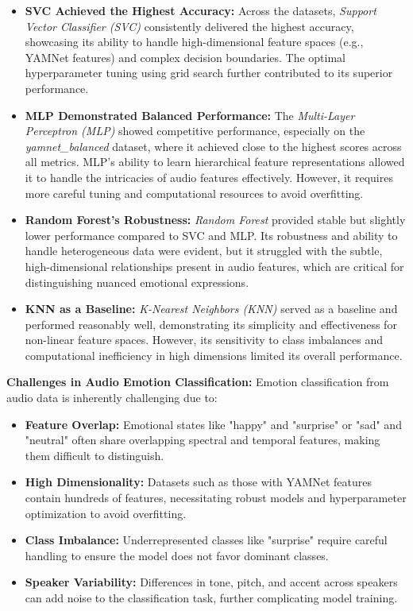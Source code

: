 \documentclass{article}
\begin{document}
\begin{itemize}
    \item \textbf{SVC Achieved the Highest Accuracy:} 
    Across the datasets, \textit{Support Vector Classifier (SVC)} consistently delivered the highest accuracy, 
    showcasing its ability to handle high-dimensional feature spaces (e.g., YAMNet features) and complex decision 
    boundaries. The optimal hyperparameter tuning using grid search further contributed to its superior performance.

    \item \textbf{MLP Demonstrated Balanced Performance:} 
    The \textit{Multi-Layer Perceptron (MLP)} showed competitive performance, especially on the \textit{yamnet\_balanced} 
    dataset, where it achieved close to the highest scores across all metrics. MLP's ability to learn hierarchical 
    feature representations allowed it to handle the intricacies of audio features effectively. However, it requires 
    more careful tuning and computational resources to avoid overfitting.

    \item \textbf{Random Forest's Robustness:} 
    \textit{Random Forest} provided stable but slightly lower performance compared to SVC and MLP. Its robustness and 
    ability to handle heterogeneous data were evident, but it struggled with the subtle, high-dimensional relationships 
    present in audio features, which are critical for distinguishing nuanced emotional expressions.

    \item \textbf{KNN as a Baseline:} 
    \textit{K-Nearest Neighbors (KNN)} served as a baseline and performed reasonably well, demonstrating its simplicity 
    and effectiveness for non-linear feature spaces. However, its sensitivity to class imbalances and computational 
    inefficiency in high dimensions limited its overall performance.
\end{itemize}

\textbf{Challenges in Audio Emotion Classification:}
Emotion classification from audio data is inherently challenging due to:
\begin{itemize}
    \item \textbf{Feature Overlap:} Emotional states like "happy" and "surprise" or "sad" and "neutral" often share 
    overlapping spectral and temporal features, making them difficult to distinguish.
    \item \textbf{High Dimensionality:} Datasets such as those with YAMNet features contain hundreds of features, 
    necessitating robust models and hyperparameter optimization to avoid overfitting.
    \item \textbf{Class Imbalance:} Underrepresented classes like "surprise" require careful handling to ensure the 
    model does not favor dominant classes.
    \item \textbf{Speaker Variability:} Differences in tone, pitch, and accent across speakers can add noise to the 
    classification task, further complicating model training.
\end{itemize}
\end{document}
